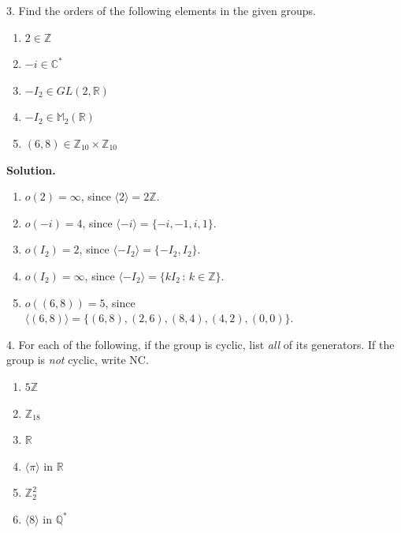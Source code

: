 \documentclass[10pt,]{book}
\theoremstyle{plain}
\theoremstyle{definition}
\theoremstyle{definition}
\theoremstyle{definition}
\theoremstyle{definition}
\numberwithin{equation}{section}
\def\Z{\mathbb{Z}}
\def\R{\mathbb{R}}
\def\Q{\mathbb{Q}}
\def\C{\mathbb{C}}
\def\M{\mathbb{M}}
\begin{document}
\begin{exerciselist}
\item[3.]\hypertarget{exercise-36}{}
        Find the orders of the following elements in the given groups.
        \leavevmode%
\begin{enumerate}[label=(\alph*)]
\item\hypertarget{li-283}{}
              \(2\in \Z\)
\item\hypertarget{li-284}{}
              \(-i\in \C^*\)
 
\item\hypertarget{li-285}{}
              \(-I_2\in GL(2,\R)\)
\item\hypertarget{li-286}{}
              \(-I_2\in \M_2(\R)\)
\item\hypertarget{li-287}{}
              \((6,8)\in \Z_{10}\times \Z_{10}\)
\end{enumerate}

\par\smallskip
\par\smallskip
\noindent\textbf{Solution.}\hypertarget{solution-36}{}\quad
\leavevmode%
\begin{enumerate}[label=(\alph*)]
\item\hypertarget{li-288}{}
          \(o(2)=\infty\), since \(\langle 2\rangle =2\Z\).
\item\hypertarget{li-289}{}
          \(o(-i)=4\), since \(\langle -i\rangle =\{-i,-1,i,1\}\).
\item\hypertarget{li-290}{}
          \(o(I_2)=2\), since \(\langle -I_2\rangle =\{-I_2,I_2\}\).
\item\hypertarget{li-291}{}
          \(o(I_2)=\infty\), since \(\langle -I_2\rangle =\{kI_2\,:\,k\in \Z\}\).
\item\hypertarget{li-292}{}
          \(o((6,8))=5\), since \(\langle (6,8)\rangle =\{(6,8),(2,6),(8,4),(4,2),(0,0)\}\).
\end{enumerate}
\item[4.]\hypertarget{exercise-37}{}
        For each of the following, if the group is cyclic, list \emph{all} of its generators. If the group is \emph{not} cyclic, write NC.
        \leavevmode%
\begin{enumerate}[label=(\alph*)]
\item\hypertarget{li-293}{}
              \(5\Z\)
\item\hypertarget{li-294}{}
              \(\Z_{18}\)
\item\hypertarget{li-295}{}
              \(\R\)
\item\hypertarget{li-296}{}
              \(\langle \pi\rangle\) in \(\R\)
\item\hypertarget{li-297}{}
              \(\Z_2^2\)
\item\hypertarget{li-298}{}
              \(\langle 8\rangle\) in \(\Q^*\)
\end{enumerate}


\end{exerciselist}
\end{document}
